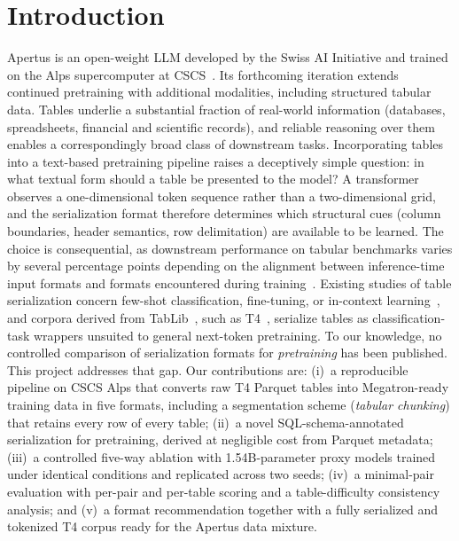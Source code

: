 \documentclass[11pt,a4paper]{article}
\begin{document}
\section{Introduction}
Apertus is an open-weight LLM developed by the Swiss AI Initiative and trained on the Alps supercomputer at CSCS~\cite{apertus}. Its forthcoming iteration extends continued pretraining with additional modalities, including structured tabular data. Tables underlie a substantial fraction of real-world information (databases, spreadsheets, financial and scientific records), and reliable reasoning over them enables a correspondingly broad class of downstream tasks.
Incorporating tables into a text-based pretraining pipeline raises a deceptively simple question: in what textual form should a table be presented to the model? A transformer observes a one-dimensional token sequence rather than a two-dimensional grid, and the serialization format therefore determines which structural cues (column boundaries, header semantics, row delimitation) are available to be learned. The choice is consequential, as downstream performance on tabular benchmarks varies by several percentage points depending on the alignment between inference-time input formats and formats encountered during training~\cite{wu2025}.
Existing studies of table serialization concern few-shot classification, fine-tuning, or in-context learning~\cite{tabllm,jaitly,wang,ono}, and corpora derived from TabLib~\cite{tablib}, such as T4~\cite{t4}, serialize tables as classification-task wrappers unsuited to general next-token pretraining. To our knowledge, no controlled comparison of serialization formats for \emph{pretraining} has been published. This project addresses that gap. Our contributions are: (i)~a reproducible pipeline on CSCS Alps that converts raw T4 Parquet tables into Megatron-ready training data in five formats, including a segmentation scheme (\emph{tabular chunking}) that retains every row of every table; (ii)~a novel SQL-schema-annotated serialization for pretraining, derived at negligible cost from Parquet metadata; (iii)~a controlled five-way ablation with 1.54B-parameter proxy models trained under identical conditions and replicated across two seeds; (iv)~a minimal-pair evaluation with per-pair and per-table scoring and a table-difficulty consistency analysis; and (v)~a format recommendation together with a fully serialized and tokenized T4 corpus ready for the Apertus data mixture.
\end{document}
